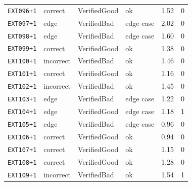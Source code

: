 \begin{longtable}{@{}l l l l r r@{}}
\texttt{EXT096{+}1} & correct & VerifiedGood & ok & 1.52 & 0 \\
\texttt{EXT097{+}1} & edge & VerifiedBad & edge case & 2.02 & 0 \\
\texttt{EXT098{+}1} & edge & VerifiedBad & edge case & 1.60 & 0 \\
\texttt{EXT099{+}1} & correct & VerifiedGood & ok & 1.38 & 0 \\
\texttt{EXT100{+}1} & incorrect & VerifiedBad & ok & 1.46 & 0 \\
\texttt{EXT101{+}1} & correct & VerifiedGood & ok & 1.16 & 0 \\
\texttt{EXT102{+}1} & incorrect & VerifiedBad & ok & 1.45 & 0 \\
\texttt{EXT103{+}1} & edge & VerifiedBad & edge case & 1.22 & 0 \\
\texttt{EXT104{+}1} & edge & VerifiedGood & edge case & 1.18 & 1 \\
\texttt{EXT105{+}1} & edge & VerifiedBad & edge case & 0.96 & 0 \\
\texttt{EXT106{+}1} & correct & VerifiedGood & ok & 0.94 & 0 \\
\texttt{EXT107{+}1} & correct & VerifiedGood & ok & 1.15 & 0 \\
\texttt{EXT108{+}1} & correct & VerifiedGood & ok & 1.28 & 0 \\
\texttt{EXT109{+}1} & incorrect & VerifiedBad & ok & 1.54 & 1 \\
\end{longtable}
